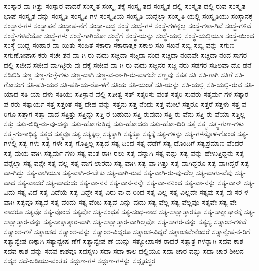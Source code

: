{ಸಂಸ್ಕಾರ-ವಾ-ಗಿತ್ತು
ಸಂಸ್ಕಾರ-ವಾದರೆ
ಸಂಸ್ಕೃತ
ಸಂಸ್ಕೃ-ತಕ್ಕೆ
ಸಂಸ್ಕೃ-ತದ
ಸಂಸ್ಕೃತ-ದಲ್ಲಿ
ಸಂಸ್ಕೃತ-ದಲ್ಲಿ-ರುವ
ಸಂಸ್ಕೃತ-ಭಾಷೆ
ಸಂಸ್ಕೃತ-ವನ್ನು
ಸಂಸ್ಕೃತಿ
ಸಂಸ್ಕೃತಿ-ಗಳ
ಸಂಸ್ಕೃತಿಯ
ಸಂಸ್ಕೃತಿ-ಯನ್ನೆಲ್ಲಾ
ಸಂಸ್ಕೃತಿ-ಯಲ್ಲಿ
ಸಂಸ್ಕೃತಿಯು
ಸಂಸ್ಥಾನಕ್ಕೆ
ಸಂಸ್ಥಾನ-ಗಳ
ಸಂಸ್ಥಾಪನೆ
ಸಂಸ್ಥಾಪ-ನೆಗೆ
ಸಂಸ್ಥಾ-ಬದ್ಧ
ಸಂಸ್ಥೆ
ಸಂಸ್ಥೆ-ಗಳ
ಸಂಸ್ಥೆ-ಗಳನ್ನಲ್ಲ
ಸಂಸ್ಥೆ-ಗಳಾ-ಗಿವೆ
ಸಂಸ್ಥೆ-ಗಳಿವೆ
ಸಂಸ್ಥೆ-ಗಳಿವೆಯೋ
ಸಂಸ್ಥೆ-ಗಳು
ಸಂಸ್ಥೆ-ಗಾಗಿಯೋ
ಸಂಸ್ಥೆಗೆ
ಸಂಸ್ಥೆ-ಯನ್ನು
ಸಂಸ್ಥೆ-ಯಲ್ಲಿ
ಸಂಸ್ಥೆ-ಯಲ್ಲಿಯೂ
ಸಂಸ್ಥೆ-ಯಿಂದ
ಸಂಸ್ಥೆ-ಯಿದ್ದ
ಸಂಹಾರ-ವಾ-ಯಿತು
ಸಂಹಿತೆ
ಸಕಾರಾ
ಸಕಾರಾತ್ಮಕ
ಸಕಾಲ
ಸಖ
ಸಖನೆ
ಸಖ್ಯ
ಸಖ್ಯ-ವನ್ನು
ಸಗುಣ
ಸಗುಣೋಪಾಸ-ಕರು
ಸಚೇ-ತನ-ವಾ-ಗಿ-ರು-ವುದು
ಸಚ್ಚಿದಾ
ಸಚ್ಚಿದಾ-ನಂದ
ಸಚ್ಚಿದಾ-ನಂದವೇ
ಸಚ್ಚಿದಾ-ನಂದ-ಸಾಗರ-ದಲ್ಲಿ
ಸಜೀವ
ಸಜೀವ-ವಾಗಿಟ್ಟಿರು-ವು-ದಕ್ಕೆ
ಸಜೀವ-ವಾ-ಗಿ-ರು-ವುದು
ಸಜ್ಜನರ
ಸಜ್ಜ-ನರು
ಸಡಗರ
ಸಡಿಲವಾ-ದೊ-ಡನೆ
ಸಡಿಲಿಸಿ
ಸಣ್ಣ
ಸಣ್ಣ-ಗುಳ್ಳೆ-ಗಳು
ಸಣ್ಣ-ದಾಗಿ
ಸಣ್ಣ-ವ-ರಾ-ಗಿ-ರು-ವಾಗಲೇ
ಸಣ್ಣವು
ಸತತ
ಸತಿ
ಸತಿ-ಗಾಗಿ
ಸತಿಗೆ
ಸತಿ-ಗೋಸುಗ
ಸತಿ-ಪತಿ-ಯರ
ಸತಿ-ಪತಿ-ಯ-ರೊ-ಳಗೆ
ಸತಿಯ
ಸತಿ-ಯಂತೆ
ಸತಿ-ಯನ್ನು
ಸತಿ-ಯಲ್ಲಿ
ಸತಿ-ಯಲ್ಲಿ-ರುವ
ಸತಿ-ಯಾದ
ಸತಿ-ಯಾ-ದಳು
ಸತಿಯು
ಸತಿಸ್ಥಾನ-ವೆಲ್ಲಿ
ಸತೀತ್ವ
ಸತ್
ಸತ್ಕರಿಸು-ವಂತೆ
ಸತ್ಕರಿ-ಸುವರು
ಸತ್ಕರ್ಮ-ಗಳ
ಸತ್ಕಾರ-ಪ-ರರು
ಸತ್ಕಾರ್ಯ
ಸತ್ತ
ಸತ್ತಂತೆ
ಸತ್ತ-ದೇಹ-ವನ್ನು
ಸತ್ತನು
ಸತ್ತ-ನೆಂದು
ಸತ್ತ-ಮೇಲೆ
ಸತ್ತರೂ
ಸತ್ತರೆ
ಸತ್ತಳು
ಸತ್ತ-ವ-ರಿಗೂ
ಸತ್ತಾಗ
ಸತ್ತಾ-ವಾದ
ಸತ್ತಿತ್ತು
ಸತ್ತಿದ್ದು
ಸತ್ತಿ-ರ-ಬಹುದು
ಸತ್ತಿ-ರುವುದು
ಸತ್ತಿ-ರು-ವೆನು
ಸತ್ತಿ-ರು-ವೆಯಾ
ಸತ್ತಿಲ್ಲ
ಸತ್ತು
ಸತ್ತು-ಬಿದ್ದಿ-ರು-ವು-ದನ್ನು
ಸತ್ತು-ಹೋಗುತ್ತಿದ್ದ
ಸತ್ತು-ಹೋದರು
ಸತ್ತು-ಹೋ-ದಿರಿ
ಸತ್ತೆ
ಸತ್ತ್ವ
ಸತ್ತ್ವ-ಗುಣ-ಗಳು
ಸತ್ತ್ವ-ಗುಣಾಧಿಕ್ಯ
ಸತ್ತ್ವದ
ಸತ್ತ್ವವೂ
ಸತ್ಯ
ಸತ್ಯಕ್ಕಲ್ಲ
ಸತ್ಯಕ್ಕಾಗಿ
ಸತ್ಯಕ್ಕೂ
ಸತ್ಯಕ್ಕೆ
ಸತ್ಯ-ಗಳನ್ನು
ಸತ್ಯ-ಗಳನ್ನೊಳ-ಗೊಂಡ
ಸತ್ಯ-ಗಳಲ್ಲಿ
ಸತ್ಯ-ಗಳು
ಸತ್ಯ-ಗಳೇ
ಸತ್ಯ-ಗೊತ್ತಿಲ್ಲ
ಸತ್ಯದ
ಸತ್ಯ-ದಿಂದ
ಸತ್ಯ-ದೆಡೆಗೆ
ಸತ್ಯ-ದೊಂದಿಗೆ
ಸತ್ಯಪ್ರಮಾಣ-ವೆಂದರೆ
ಸತ್ಯ-ಮಯ-ವಾಗಿ
ಸತ್ಯರ್ಮ-ಗಳು
ಸತ್ಯ-ವಂತ-ರಾಗಿ-ರಲು
ಸತ್ಯ-ವನ್ನಾಗಿ
ಸತ್ಯ-ವನ್ನು
ಸತ್ಯ-ವನ್ನು-ಹೇಳುತ್ತಿದ್ದನು
ಸತ್ಯ-ವನ್ನೆಲ್ಲಾ
ಸತ್ಯ-ವನ್ನೇ
ಸತ್ಯ-ವಲ್ಲ
ಸತ್ಯ-ವಾಗ-ಲಾರದು
ಸತ್ಯ-ವಾಗಿ
ಸತ್ಯ-ವಾ-ಗಿತ್ತು
ಸತ್ಯ-ವಾಗಿದ್ದರೂ
ಸತ್ಯ-ವಾಗಿದ್ದರೆ
ಸತ್ಯ-ವಾ-ಗಿದ್ದು
ಸತ್ಯ-ವಾಗಿಯೂ
ಸತ್ಯ-ವಾಗಿ-ರ-ಬೇಕು
ಸತ್ಯ-ವಾಗಿ-ರುವ
ಸತ್ಯ-ವಾಗಿ-ರು-ವು-ದೆಲ್ಲ
ಸತ್ಯ-ವಾಗು-ವೆವು
ಸತ್ಯ-ವಾದ
ಸತ್ಯ-ವಾದರೆ
ಸತ್ಯ-ವಾದುದು
ಸತ್ಯ-ವಾ-ನನ
ಸತ್ಯ-ವಾನ-ನನ್ನೇ
ಸತ್ಯ-ವಾ-ನನಿಂದ
ಸತ್ಯ-ವಾ-ನನ್ನು
ಸತ್ಯ-ವಾನ್
ಸತ್ಯ-ವಿದು
ಸತ್ಯ-ವಿದೆ
ಸತ್ಯ-ವಿದೆಯೆ
ಸತ್ಯ-ವಿದ್ದೇ
ಸತ್ಯ-ವಿರು-ವು-ದ-ರಿಂದ
ಸತ್ಯ-ವಿಲ್ಲ
ಸತ್ಯ-ವಿಲ್ಲದೇ
ಸತ್ಯವು
ಸತ್ಯ-ವು-ಸರ-ಳ-ವಾಗಿ
ಸತ್ಯವೂ
ಸತ್ಯವೆ
ಸತ್ಯ-ವೆಂದು
ಸತ್ಯ-ವೆಂಬ
ಸತ್ಯವೆ-ಎನ್ನು-ವುದು
ಸತ್ಯ-ವೆಲ್ಲ
ಸತ್ಯ-ವೆಲ್ಲವೂ
ಸತ್ಯವೇ
ಸತ್ಯ-ವೇ-ನಾದರೂ
ಸತ್ಯವೊ
ಸತ್ಯ-ವೊಂದೆ
ಸತ್ಯವೋ
ಸತ್ಯ-ಸಂಧತೆ
ಸತ್ಯ-ಸಂಧ-ನಾದ
ಸತ್ಯ-ಸಾಕ್ಷಾತ್ಕಾರಕ್ಕೂ
ಸತ್ಯ-ಸಾಕ್ಷಾತ್ಕಾರಕ್ಕೆ
ಸತ್ಯ-ಸಾಕ್ಷಾತ್ಕಾರ-ವನ್ನು
ಸತ್ಯ-ಸಾಕ್ಷಾತ್ಕಾರ-ವಾಗಿ
ಸತ್ಯ-ಸಾಕ್ಷಾತ್ಕಾರ-ವಾಗಿಲ್ಲವೋ
ಸತ್ಯ-ಸಾಗರ-ವನ್ನು
ಸತ್ಯಸ್ಯ
ಸತ್ಯಾಂಶ-ಗಳಿವೆ
ಸತ್ಯಾಂಶ-ಗಳೆ
ಸತ್ಯಾಂಶದ
ಸತ್ಯಾಂಶ-ವನ್ನು
ಸತ್ಯಾಂಶ-ವಿದ್ದರೂ
ಸತ್ಯಾಂಶ-ವಿದ್ದರೆ
ಸತ್ಯಾಂಶವೇನೆಂದರೆ
ಸತ್ಯಾನ್ವೇಷ-ಕ-ರಿಗೆ
ಸತ್ಯಾನ್ವೇಷ-ಣಕ್ಕಾಗಿ
ಸತ್ಯಾನ್ವೇಷ-ಣೆಗೆ
ಸತ್ಯಾನ್ವೇಷ-ಣೆ-ಯನ್ನು
ಸತ್ಯೋಪಾಸಕ-ರಾದರೆ
ಸತ್ಶಾತ್ರ-ಗಳನ್ನಾಗಿ
ಸದವ-ಕಾಶ
ಸದವ-ಕಾಶ-ವನ್ನು
ಸದವ-ಕಾಶವೂ
ಸದಸ್ಯಳು
ಸದಾ
ಸದಾ-ಕಾಲ-ದಲ್ಲಿಯೂ
ಸದಾ-ಚಾರ-ವನ್ನು
ಸದಾ-ಚಾರ-ಶೀಲನ
ಸದೃಶ
ಸದೆ-ಬಡಿಯು-ವಂತಹ
ಸದ್ಗುಣ-ಗಳ
ಸದ್ಗುಣ-ಗಳನ್ನು
ಸದ್ಗೃಹಸ್ಥರ
}
